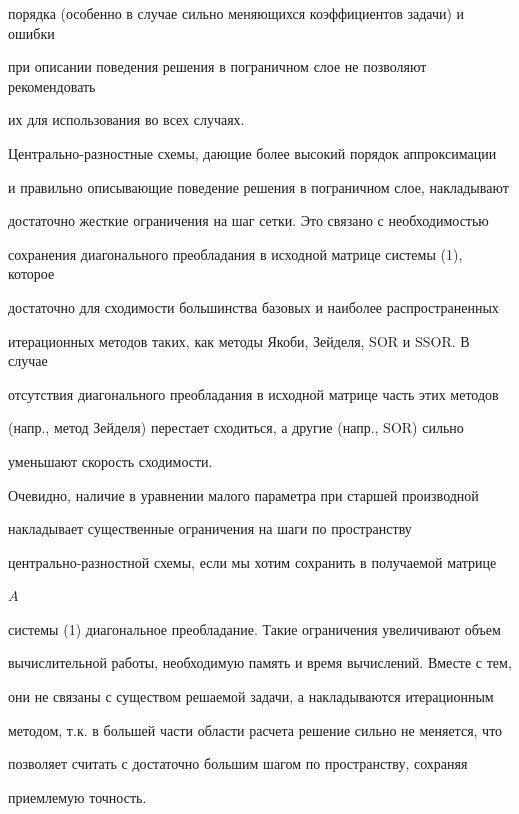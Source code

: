 порядка (особенно в случае сильно меняющихся коэффициентов задачи) и ошибки 


при описании поведения решения в пограничном слое не позволяют рекомендовать 


их для использования во всех случаях. 


 


Центрально-разностные схемы, дающие более высокий порядок аппроксимации 


и правильно описывающие поведение решения в пограничном слое, накладывают 


достаточно жесткие ограничения на шаг сетки. Это связано с необходимостью 


сохранения диагонального преобладания в исходной матрице системы (1), которое 


достаточно для сходимости большинства базовых и наиболее распространенных 


итерационных методов таких, как методы Якоби, Зейделя, SOR и SSOR. В случае 


отсутствия диагонального преобладания в исходной матрице часть этих методов 


(напр., метод Зейделя) перестает сходиться, а другие (напр., SOR) сильно 


уменьшают скорость сходимости. 


 


Очевидно, наличие в уравнении малого параметра при старшей производной 


накладывает существенные ограничения на шаги по пространству 


центрально-разностной схемы, если мы хотим сохранить в получаемой матрице 


$A$ 


системы (1) диагональное преобладание. Такие ограничения увеличивают объем 


вычислительной работы, необходимую память и время вычислений. Вместе с тем, 


они не связаны с существом решаемой задачи, а накладываются итерационным 


методом, т.к. в большей части области расчета решение сильно не меняется, что 


позволяет считать с достаточно большим шагом по пространству, сохраняя 


приемлемую точность. 


 


